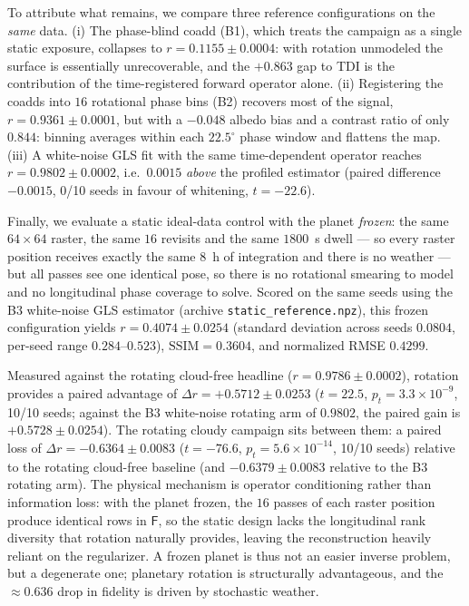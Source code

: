 \documentclass[twocolumn,10pt]{article}
\begin{document}
To attribute what remains, we compare three reference configurations on the
\emph{same} data. (i) The phase-blind coadd (B1), which treats the campaign as a
single static exposure, collapses to $r=0.1155\pm0.0004$: with rotation
unmodeled the surface is essentially unrecoverable, and the $+0.863$ gap to TDI
is the contribution of the time-registered forward operator alone. (ii)
Registering the coadds into $16$ rotational phase bins (B2) recovers most of the
signal, $r=0.9361\pm0.0001$, but with a $-0.048$ albedo bias and a contrast
ratio of only $0.844$: binning averages within each $22.5^{\circ}$ phase window
and flattens the map. (iii) A white-noise GLS fit with the same time-dependent
operator reaches $r=0.9802\pm0.0002$, i.e.\ $0.0015$ \emph{above} the profiled
estimator (paired difference $-0.0015$, 0/10 seeds in favour of whitening,
$t=-22.6$).

Finally, we evaluate a static ideal-data control with the planet \emph{frozen}: the same $64\times64$ raster, the
same $16$ revisits and the same $1800$~s dwell --- so every raster position
receives exactly the same $8$~h of integration and there is no weather --- but
all passes see one identical pose, so there is no rotational smearing to model
and no longitudinal phase coverage to solve. Scored on the same seeds using the B3 white-noise GLS estimator
(archive \texttt{static\_reference.npz}), this frozen configuration
yields $r=0.4074\pm0.0254$ (standard deviation across seeds
$0.0804$, per-seed range $0.284$--$0.523$), $\mathrm{SSIM}=0.3604$, and normalized
RMSE $0.4299$.

Measured against the rotating cloud-free headline ($r=0.9786\pm0.0002$), rotation provides a paired advantage of
$\Delta r = +0.5712\pm0.0253$ ($t=22.5$, $p_t=3.3\times10^{-9}$, 10/10 seeds; against the B3 white-noise rotating arm of $0.9802$, the paired gain is $+0.5728\pm0.0254$). The rotating cloudy campaign sits between them: a paired loss of $\Delta r = -0.6364\pm0.0083$ ($t=-76.6$, $p_t=5.6\times10^{-14}$, 10/10 seeds) relative to the rotating cloud-free baseline (and $-0.6379\pm0.0083$ relative to the B3 rotating arm). The physical mechanism is operator conditioning rather than information loss: with the planet frozen,
the $16$ passes of each raster position produce identical rows in
$\mathsf{F}$, so the static design lacks the longitudinal rank diversity that rotation naturally provides, leaving the reconstruction heavily reliant on the regularizer. A frozen planet is thus not an easier inverse problem, but a degenerate one; planetary rotation is structurally advantageous, and the $\approx0.636$ drop in fidelity is driven by stochastic weather.
\end{document}
